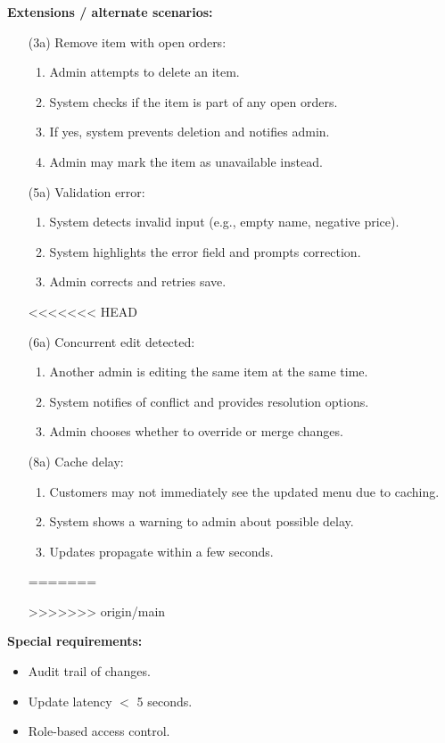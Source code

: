 \documentclass{article}
\begin{document}
\textbf{Extensions / alternate scenarios:}
\begin{itemize}
    \item[(3a)] Remove item with open orders:
    \begin{enumerate}
        \item Admin attempts to delete an item.
        \item System checks if the item is part of any open orders.
        \item If yes, system prevents deletion and notifies admin.
        \item Admin may mark the item as unavailable instead.
    \end{enumerate}

    \item[(5a)] Validation error:
    \begin{enumerate}
        \item System detects invalid input (e.g., empty name, negative price).
        \item System highlights the error field and prompts correction.
        \item Admin corrects and retries save.
    \end{enumerate}

<<<<<<< HEAD
    \item[(6a)] Concurrent edit detected:
    \begin{enumerate}
        \item Another admin is editing the same item at the same time.
        \item System notifies of conflict and provides resolution options.
        \item Admin chooses whether to override or merge changes.
    \end{enumerate}

    \item[(8a)] Cache delay:
    \begin{enumerate}
        \item Customers may not immediately see the updated menu due to caching.
        \item System shows a warning to admin about possible delay.
        \item Updates propagate within a few seconds.
    \end{enumerate}
=======

>>>>>>> origin/main
\end{itemize}


\textbf{Special requirements:}
\begin{itemize}
    \item Audit trail of changes.
    \item Update latency $<$ 5 seconds.
    \item Role-based access control.
\end{itemize}
\end{document}
